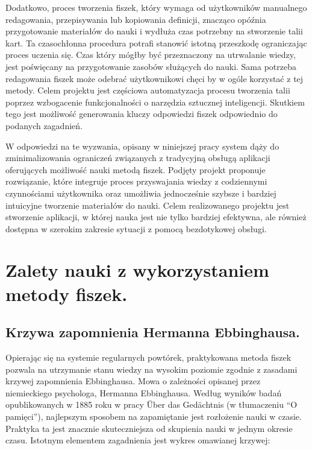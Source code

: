 Dodatkowo, proces tworzenia fiszek, który wymaga od użytkowników manualnego redagowania, przepisywania lub kopiowania definicji, znacząco opóźnia przygotowanie materiałów do nauki i wydłuża czas potrzebny na stworzenie talii kart. Ta czasochłonna procedura potrafi stanowić istotną przeszkodę ograniczając proces uczenia się. Czas który mógłby być przeznaczony na utrwalanie wiedzy, jest poświęcany na przygotowanie zasobów służących do nauki. Sama potrzeba redagowania fiszek może odebrać użytkownikowi chęci by w ogóle korzystać z tej metody. Celem projektu jest częściowa automatyzacja procesu tworzenia talii poprzez wzbogacenie funkcjonalności o narzędzia sztucznej inteligencji. Skutkiem tego jest możliwość generowania kluczy odpowiedzi fiszek odpowiednio do podanych zagadnień.

W odpowiedzi na te wyzwania, opisany w niniejszej pracy system dąży do zminimalizowania ograniczeń związanych z tradycyjną obsługą aplikacji oferujących możliwość nauki metodą fiszek. Podjęty projekt proponuje rozwiązanie, które integruje proces przyswajania wiedzy z codziennymi czynnościami użytkownika oraz umożliwia jednocześnie szybsze i bardziej intuicyjne tworzenie materiałów do nauki. Celem realizowanego projektu jest stworzenie aplikacji, w której nauka jest nie tylko bardziej efektywna, ale również dostępna w szerokim zakresie sytuacji z pomocą bezdotykowej obsługi.

\section{Zalety nauki z wykorzystaniem metody fiszek.}

\subsection{Krzywa zapomnienia Hermanna Ebbinghausa.}

Opierając się na systemie regularnych powtórek, praktykowana metoda fiszek pozwala na utrzymanie stanu wiedzy na wysokim poziomie zgodnie z zasadami krzywej zapomnienia Ebbinghausa. Mowa o zależności opisanej przez niemieckiego psychologa, Hermanna Ebbinghausa. Według wyników badań opublikowanych w 1885 roku w pracy \cite{1} Über das Gedächtnis (w tłumaczeniu “O pamięci”), najlepszym sposobem na zapamiętanie jest rozłożenie nauki w czasie. Praktyka ta jest znacznie skuteczniejsza od skupienia nauki w jednym okresie czasu. Istotnym elementem zagadnienia jest wykres omawianej krzywej:

